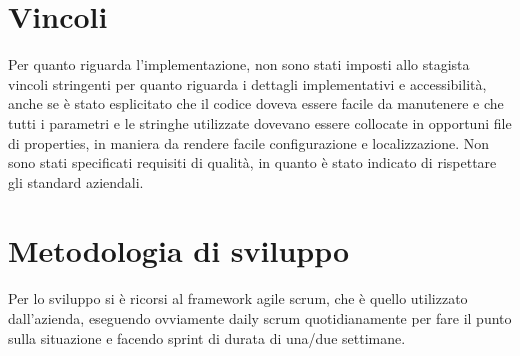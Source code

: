 \section{Vincoli}
Per quanto riguarda l'implementazione, non sono stati imposti allo stagista vincoli stringenti per quanto riguarda i dettagli implementativi e accessibilità, anche se è stato esplicitato che il codice doveva essere facile da manutenere e che tutti i parametri e le stringhe utilizzate dovevano essere collocate in opportuni file di properties, in maniera da rendere facile configurazione e localizzazione. Non sono stati specificati requisiti di qualità, in quanto è stato indicato di rispettare gli standard aziendali.
\section{Metodologia di sviluppo}
Per lo sviluppo si è ricorsi al framework agile scrum, che è quello utilizzato dall'azienda, eseguendo ovviamente daily scrum quotidianamente per fare il punto sulla situazione e facendo sprint di durata di una/due settimane.

